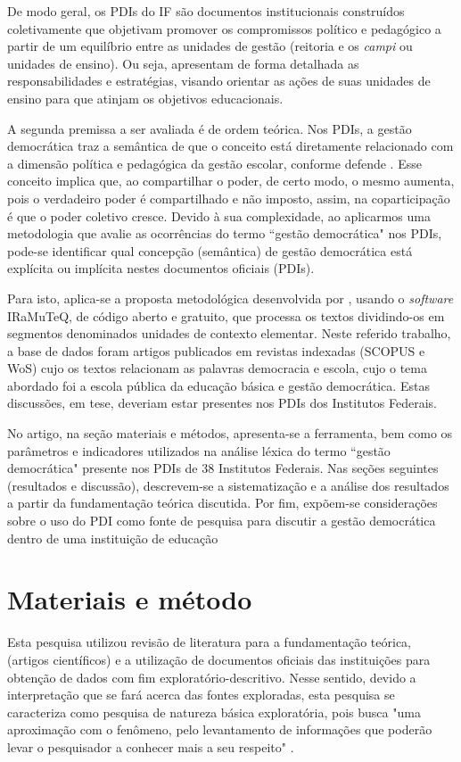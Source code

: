 \documentclass[portuguese]{textolivre}
\begin{document}
De modo geral, os PDIs do IF são documentos institucionais construídos coletivamente que objetivam promover os compromissos político e pedagógico a partir de um equilíbrio entre as unidades de gestão (reitoria e os \textit{campi} ou unidades de ensino). Ou seja, apresentam de forma detalhada as responsabilidades e estratégias, visando orientar as ações de suas unidades de ensino para que atinjam os objetivos educacionais.

A segunda premissa a ser avaliada é de ordem teórica. Nos PDIs, a gestão democrática traz a semântica de que o conceito está diretamente relacionado com a dimensão política e pedagógica da gestão escolar, conforme defende \textcite{dourado_gestao_2003}. Esse conceito implica que, ao compartilhar o poder, de certo modo, o mesmo aumenta, pois o verdadeiro poder é compartilhado e não imposto, assim, na coparticipação é que o poder coletivo cresce. Devido à sua complexidade, ao aplicarmos uma metodologia que avalie as ocorrências do termo “gestão democrática" nos PDIs, pode-se identificar qual concepção (semântica) de gestão democrática está explícita ou implícita nestes documentos oficiais (PDIs).

Para isto, aplica-se a proposta metodológica desenvolvida por \textcite{silva_o_2021}, usando o \textit{software} IRaMuTeQ, de código aberto e gratuito, que processa os textos dividindo-os em segmentos denominados unidades de contexto elementar. Neste referido trabalho, a base de dados foram artigos publicados em revistas indexadas (SCOPUS e WoS) cujo os textos relacionam as palavras democracia e escola, cujo o tema abordado foi a escola pública da educação básica e gestão democrática. Estas discussões, em tese, deveriam estar presentes nos PDIs dos Institutos Federais.

No artigo, na seção materiais e métodos, apresenta-se a ferramenta, bem como os parâmetros e indicadores utilizados na análise léxica do termo “gestão democrática" presente nos PDIs de 38 Institutos Federais. Nas seções seguintes (resultados e discussão), descrevem-se a sistematização e a análise dos resultados a partir da fundamentação teórica discutida. Por fim, expõem-se considerações sobre o uso do PDI como fonte de pesquisa para discutir a gestão democrática dentro de uma instituição de educação

\section{Materiais e método}
Esta pesquisa utilizou revisão de literatura para a fundamentação teórica, (artigos científicos) e a utilização de documentos oficiais das instituições para obtenção de dados com fim exploratório-descritivo. Nesse sentido, devido a interpretação que se fará acerca das fontes exploradas, esta pesquisa se caracteriza como pesquisa de natureza básica exploratória, pois busca "uma aproximação com o fenômeno, pelo levantamento de informações que poderão levar o pesquisador a conhecer mais a seu respeito"  \cite[p.~25]{doxsey_metodologia_2002}.
\end{document}
